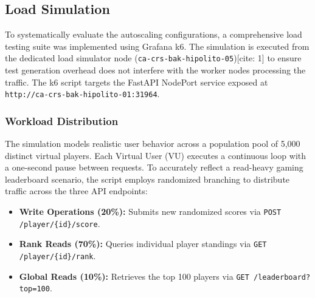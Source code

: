 \subsection{Load Simulation}
\label{subsec:load-simulation}

    To systematically evaluate the autoscaling configurations, a comprehensive load testing suite was implemented using Grafana k6. The simulation is executed from the dedicated load simulator node (\texttt{ca-crs-bak-hipolito-05})[cite: 1] to ensure test generation overhead does not interfere with the worker nodes processing the traffic. The k6 script targets the FastAPI NodePort service exposed at \texttt{http://ca-crs-bak-hipolito-01:31964}.

\subsubsection{Workload Distribution}
\label{subsubsec:workload}
    The simulation models realistic user behavior across a population pool of 5,000 distinct virtual players. Each Virtual User (VU) executes a continuous loop with a one-second pause between requests. To accurately reflect a read-heavy gaming leaderboard scenario, the script employs randomized branching to distribute traffic across the three API endpoints:
    \begin{itemize}
        \item \textbf{Write Operations (20\%):} Submits new randomized scores via \texttt{POST /player/\{id\}/score}.
        \item \textbf{Rank Reads (70\%):} Queries individual player standings via \texttt{GET /player/\{id\}/rank}.
        \item \textbf{Global Reads (10\%):} Retrieves the top 100 players via \texttt{GET /leaderboard?top=100}.
    \end{itemize}


